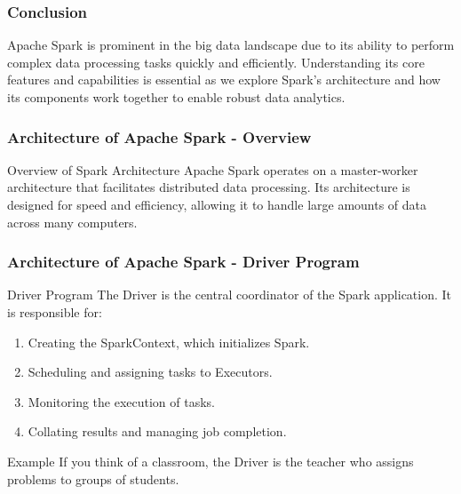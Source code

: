 \documentclass{beamer}
\begin{document}
\begin{frame}[fragile]
    \frametitle{Conclusion}
    Apache Spark is prominent in the big data landscape due to its ability to perform complex data processing tasks quickly and efficiently. 
    Understanding its core features and capabilities is essential as we explore Spark's architecture and how its components work together to enable robust data analytics.
\end{frame}

\begin{frame}[fragile]
    \frametitle{Architecture of Apache Spark - Overview}
    \begin{block}{Overview of Spark Architecture}
        Apache Spark operates on a master-worker architecture that facilitates distributed data processing.
        Its architecture is designed for speed and efficiency, allowing it to handle large amounts of data across many computers.
    \end{block}
\end{frame}

\begin{frame}[fragile]
    \frametitle{Architecture of Apache Spark - Driver Program}
    \begin{block}{Driver Program}
        The Driver is the central coordinator of the Spark application. It is responsible for:
        \begin{enumerate}
            \item Creating the SparkContext, which initializes Spark.
            \item Scheduling and assigning tasks to Executors.
            \item Monitoring the execution of tasks.
            \item Collating results and managing job completion.
        \end{enumerate}
        \begin{block}{Example}
            If you think of a classroom, the Driver is the teacher who assigns problems to groups of students.
        \end{block}
    \end{block}
\end{frame}
\end{document}
